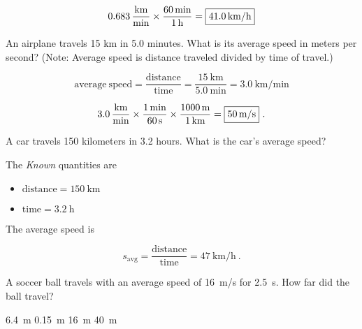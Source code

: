 \documentclass[]{exam}
\begin{document}
\begin{questions}
\begin{questions}
\begin{solution}
\begin{equation*}
    \SI[per-mode=fraction]{0.683}{\kilo\meter\per\minute} \times \frac{\SI{60}{\min}}{\SI{1}{\hour}} = \framebox{\SI{41.0}{\kilo\meter/\hour}}
\end{equation*}
\end{solution}

\question
An airplane travels 15 km in 5.0 minutes. What is its average speed in meters per second? (Note: Average speed is distance traveled divided by time of travel.)

\begin{solution}
\begin{equation*}
    \mathrm{average\ speed = \frac{distance}{time}} = \frac{\SI{15}{\kilo\meter}}{\SI{5.0}{\minute}} = \SI[per-mode=fraction]{3.0}{\kilo\meter\per\minute}
\end{equation*}

\begin{equation*}
    \SI[per-mode=fraction]{3.0}{\kilo\meter\per\minute} \times \frac{\SI{1}{\minute}}{\SI{60}{\second}} \times \frac{\SI{1000}{\meter}}{\SI{1}{\kilo\meter}} = \framebox{\SI{50}{\meter/\second}}\ .
\end{equation*}
\end{solution}


\question
A car travels 150 kilometers in 3.2 hours. What is the car's average speed?

\begin{solution}
The \textit{Known} quantities are

\begin{itemize}
    \item $\mathrm{distance} = \SI{150}{\km}$
    \item $\mathrm{time} = \SI{3.2}{\hour}$
\end{itemize}

The average speed is

\begin{equation*}
    s_{\mathrm{avg}} = \mathrm{\frac{distance}{time}} = \SI[per-mode=symbol]{47}{\km\per\hour}\ .
\end{equation*}
\end{solution}

\question
A soccer ball travels with an average speed of \SI{16}{m/s} for \SI{2.5}{s}. How far did the ball travel?

\begin{choices}
    \choice \SI{6.4}{m}
    \choice \SI{0.15}{m}
    \choice \SI{16}{m}
    \correctchoice \SI{40}{m}
\end{choices}


\end{questions}
\end{questions}
\end{document}
